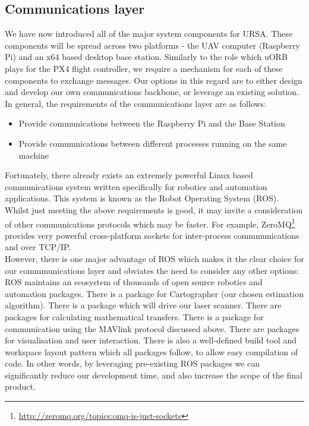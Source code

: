 \documentclass[capstone_report.tex]{subfiles}
\begin{document}
    \subsection{Communications layer}
    We have now introduced all of the major system components for URSA. These components will be spread across two platforms - the UAV computer (Raspberry Pi) and an x64 based desktop base station. Similarly to the role which uORB plays for the PX4 flight controller, we require a mechanism for each of these components to exchange messages. Our options in this regard are to either design and develop our own communications backbone, or leverage an existing solution. In general, the requirements of the communications layer are as follows:

    \begin{itemize}
    	\item Provide communications between the Raspberry Pi and the Base Station
    	\item Provide communications between different processes running on the same machine 
    \end{itemize}

    Fortunately, there already exists an extremely powerful Linux based communications system written specifically for robotics and automation applications. This system is known as the Robot Operating System (ROS). Whilst just meeting the above requirements is good, it may invite a consideration of other communications protocols which may be faster. For example, ZeroMQ\footnote{\url{http://zeromq.org/topics:omq-is-just-sockets}} provides very powerful cross-platform sockets for inter-process commmunications and over TCP/IP. \\

    However, there is one major advantage of ROS which makes it the clear choice for our commmunications layer and obviates the need to consider any other options: ROS maintains an ecosystem of thousands of open source robotics and automation packages. There is a package for Cartographer (our chosen estimation algorithm). There is a package which will drive our laser scanner. There are packages for calculating mathematical transfers. There is a package for communication using the MAVlink protocol discussed above. There are packages for visualisation and user interaction. There is also a well-defined build tool and workspace layout pattern which all packages follow, to allow easy compilation of code. In other words, by leveraging pre-existing ROS packages we can significantly reduce our development time, and also increase the scope of the final product. \\
\end{document}
